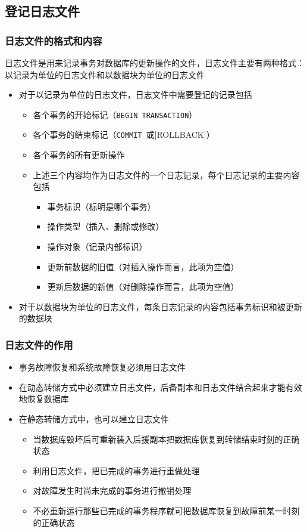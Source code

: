 \subsection{登记日志文件}

\subsubsection{日志文件的格式和内容}
日志文件是用来记录事务对数据库的更新操作的文件，日志文件主要有两种格式：以记录为单位的日志文件和以数据块为单位的日志文件
\begin{itemize}
    \item 对于以记录为单位的日志文件，日志文件中需要登记的记录包括
    \begin{itemize}
        \item 各个事务的开始标记（\verb|BEGIN TRANSACTION|）
        \item 各个事务的结束标记（\verb|COMMIT|\ 或\sverb|ROLLBACK|）
        \item 各个事务的所有更新操作
        \item 上述三个内容均作为日志文件的一个日志记录，每个日志记录的主要内容包括
        \begin{itemize}
            \item 事务标识（标明是哪个事务） 
            \item 操作类型（插入、删除或修改）
            \item 操作对象（记录内部标识）
            \item 更新前数据的旧值（对插入操作而言，此项为空值）
            \item 更新后数据的新值（对删除操作而言，此项为空值）
        \end{itemize}
    \end{itemize}
    \item 对于以数据块为单位的日志文件，每条日志记录的内容包括事务标识和被更新的数据块
\end{itemize}

\subsubsection{日志文件的作用}
\begin{itemize}
    \item 事务故障恢复和系统故障恢复必须用日志文件
    \item 在动态转储方式中必须建立日志文件，后备副本和日志文件结合起来才能有效地恢复数据库 
    \item 在静态转储方式中，也可以建立日志文件
    \begin{itemize}
        \item 当数据库毁坏后可重新装入后援副本把数据库恢复到转储结束时刻的正确状态
        \item 利用日志文件，把已完成的事务进行重做处理
        \item 对故障发生时尚未完成的事务进行撤销处理
        \item 不必重新运行那些已完成的事务程序就可把数据库恢复到故障前某一时刻的正确状态
    \end{itemize}
\end{itemize}

